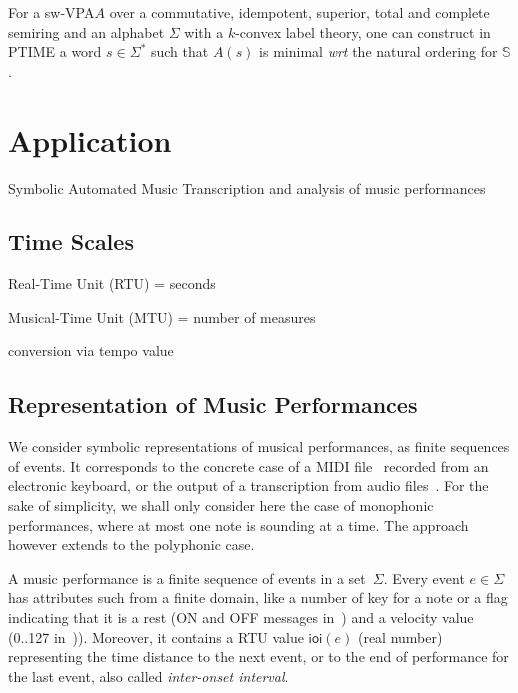 \documentclass[runningheads]{llncs}
\def\wrt{\textit{wrt}\xspace}
\newcommand{\Semiring}{\mathbb{S}}
\def\SWVPA{\textsf{sw-VPA}\xspace}
\newcommand{\ioi}[1]{\mathsf{ioi}({#1})}
\begin{document}
\begin{proposition}
For a \SWVPA $A$ over a 
commutative, idempotent, superior, total and complete semiring 
and an alphabet $\Sigma$ with a $k$-convex label theory, 
one can construct in PTIME a word $s \in \Sigma^*$ 
such that $A(s)$ is minimal \wrt the natural ordering for $\Semiring$. 
\end{proposition}




\section{Application}
\label{sec:transcription}
Symbolic Automated Music Transcription
and analysis of music performances

\subsection{Time Scales}
Real-Time Unit (RTU) = seconds

\noindent 
Musical-Time Unit (MTU) = number of measures

\noindent 
conversion via tempo value

\subsection{Representation of Music Performances}
We consider symbolic representations of musical performances, as finite sequences of events.
It corresponds to the concrete case of a MIDI file~\cite{SMF} 
recorded  from an electronic keyboard, 
or the output of a transcription from audio files~\cite{Benetos18AMTsurvey}.
%
For the sake of simplicity, 
we shall only consider here the case of monophonic performances, 
where at most one note is sounding at a time. 
The approach however extends to the polyphonic case.

A music performance is a finite sequence of events in a set~$\Sigma$.
Every event $e \in \Sigma$ has attributes such from a finite domain, 
like a number of key for a note 
or a flag indicating that it is a rest 
(\textsf{ON} and \textsf{OFF} messages in~\cite{SMF})
and a velocity value (0..127 in~\cite{SMF})).
Moreover, it contains a RTU value $\ioi{e}$ (real number) 
representing the time distance to the next event, 
or to the end of performance for the last event,
also called \emph{inter-onset interval}.
\end{document}

